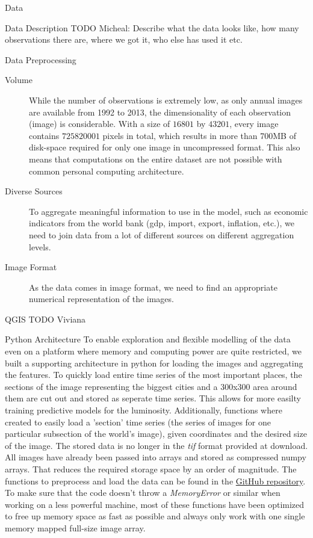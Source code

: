 \documentclass[12pt,fleqn,leqno,letterpaper]{article}
\begin{document}
\begin{section}{Data}
  \begin{subsection}{Data Description}
    TODO Micheal: Describe what the data looks like, how many observations there are, where we got it, who else has used it etc.
  \end{subsection}
  \begin{subsection}{Data Preprocessing}
    \begin{description}
      \item[Volume]{While the number of observations is extremely low, as only annual images are available from 1992 to 2013, the dimensionality of each observation (image) is considerable. With a size of $16801$ by $43201$, every image contains $725820001$ pixels in total, which results in more than 700MB of disk-space required for only one image in uncompressed format. This also means that computations on the entire dataset are not possible with common personal computing architecture.}
      \item[Diverse Sources]{To aggregate meaningful information to use in the model, such as economic indicators from the world bank (gdp, import, export, inflation, etc.), we need to join data from a lot of different sources on different aggregation levels.}
      \item[Image Format]{As the data comes in image format, we need to find an appropriate numerical representation of the images.}
    \end{description}
    \begin{subsubsection}{QGIS}
      TODO Viviana
    \end{subsubsection}
    \begin{subsubsection}{Python Architecture}
      To enable exploration and flexible modelling of the data even on a platform where memory and computing power are quite restricted, we built a supporting architecture in python for loading the images and aggregating the features.
      To quickly load entire time series of the most important places, the sections of the image representing the biggest cities and a 300x300 area around them are cut out and stored as seperate time series. This allows for more easilty training predictive models for the luminosity.
      Additionally, functions where created to easily load a 'section' time series (the series of images for one particular subsection of the world's image), given coordinates and the desired size of the image.
      The stored data is no longer in the \textit{tif} format provided at download. All images have already been passed into arrays and stored as compressed numpy arrays. That reduces the required storage space by an order of magnitude.
      The functions to preprocess and load the data can be found in the \hyperref[www.github.com/westermann/luminosity]{GitHub repository}. To make sure that the code doesn't throw a \textit{MemoryError} or similar when working on a less powerful machine, most of these functions have been optimized to free up memory space as fast as possible and always only work with one single memory mapped full-size image array.
    \end{subsubsection}
  \end{subsection}
\end{section}
\end{document}
